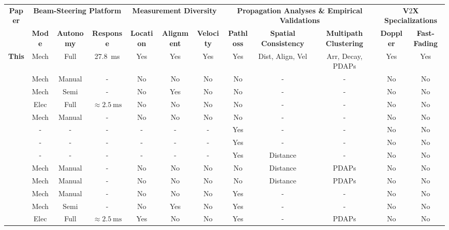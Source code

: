 \documentclass[12pt, draftcls, onecolumn]{IEEEtran}
\begin{document}
\begin{table}
    \centering
    \scriptsize
    \begin{tabular}{|*{12}{c|}}
    \hline
    \multirow{2}{*}{{\bf{Paper}}} &
	\multicolumn{3}{c|}{\bf{Beam-Steering Platform}} &
    \multicolumn{3}{c|}{\bf{Measurement Diversity}} &
    \multicolumn{3}{c|}{\bf{Propagation Analyses \& Empirical Validations}} &
	\multicolumn{2}{c|}{\bf{V$2$X Specializations}}\\ &
    \bf{Mode} &
	\bf{Autonomy} &
   	\bf{Response} &
	\bf{Location} & 
    \bf{Alignment} &
    \bf{Velocity} &
    \bf{Pathloss} &
    \bf{Spatial Consistency} &
	\bf{Multipath Clustering} &
	\bf{Doppler} & 
    \bf{Fast-Fading}\\
    \hline
	\bf{This} & Mech & Full & \SI{27.8}{\milli\second} & Yes & Yes & Yes & Yes & Dist, Align, Vel  & Arr, Decay, PDAPs & Yes & Yes\\
	\hline
    \cite{Purdue} & Mech & Manual & - & No & No & No & No & - & - & No & No\\
    \hline
    \cite{Foliage} & Mech & Semi & - & No & Yes & No & No & - & - & No & No\\
    \hline
    \cite{AgileLink} & Elec & Full & ${\approx}\SI{2.5}{\milli\second}$ & No & No & No & No & - & - & No & No\\
    \hline
    \cite{Harvard} & Mech & Manual & - & No & No & No & No & - & - & No & No\\
    \hline
    \cite{Qualcomm3GPP} & - & - & - & - & - & - & Yes & - & - & No & No\\
    \hline
    \cite{MacCartneyModelsOverview} & - & - & - & - & - & - & Yes & - & - & No & No\\
    \hline
    \cite{MacCartneyRural} & - & - & - & - & - & - & Yes & Distance & - & No & No\\
    \hline
    \cite{SpatialConsistencyOriginal} & Mech & Manual & - & No & No & No & No & Distance & PDAPs & No & No\\
    \hline
    \cite{SpatialDynamics} & Mech & Manual & - & No & No & No & No & Distance & PDAPs & No & No\\
    \hline
    \cite{SuburbanGeometryJournal} & Mech & Manual & - & No & No & No & Yes & - & - & No & No\\
    \hline
    \cite{FoliageSimulations} & Mech & Semi & - & No & Yes & No & Yes & - & - & No & No\\
    \hline
    \cite{Outdoor28G} & Elec & Full & ${\approx}\SI{2.5}{\milli\second}$ & Yes & No & No & Yes & - & PDAPs & No & No\\

\end{tabular}
\end{table}
\end{document}
